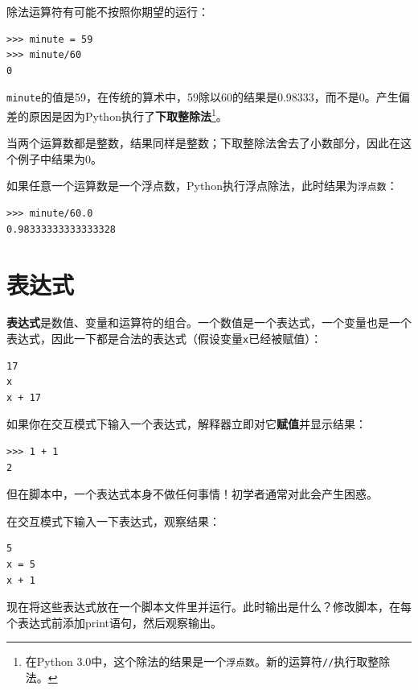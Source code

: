 

除法运算符有可能不按照你期望的运行：

\beforeverb
\begin{verbatim}
>>> minute = 59
>>> minute/60
0
\end{verbatim}
\afterverb
%
{\tt minute}的值是59，在传统的算术中，59除以60的结果是0.98333，而不是0。产生偏差的原因是因为Python执行了{\bf 下取整除法}\footnote{在Python 3.0中，这个除法的结果是一个{\tt 浮点数}。新的运算符{\tt //}执行取整除法。}。


当两个运算数都是整数，结果同样是整数；下取整除法舍去了小数部分，因此在这个例子中结果为0。

如果任意一个运算数是一个浮点数，Python执行浮点除法，此时结果为{\tt 浮点数}：

\beforeverb
\begin{verbatim}
>>> minute/60.0
0.98333333333333328
\end{verbatim}
\afterverb


\section{表达式}

{\bf 表达式}是数值、变量和运算符的组合。一个数值是一个表达式，一个变量也是一个表达式，因此一下都是合法的表达式（假设变量{\tt x}已经被赋值）：


\beforeverb
\begin{verbatim}
17
x
x + 17
\end{verbatim}
\afterverb
%
如果你在交互模式下输入一个表达式，解释器立即对它{\bf 赋值}并显示结果：

\beforeverb
\begin{verbatim}
>>> 1 + 1
2
\end{verbatim}
\afterverb
%
但在脚本中，一个表达式本身不做任何事情！初学者通常对此会产生困惑。

\begin{ex}
在交互模式下输入一下表达式，观察结果：

\beforeverb
\begin{verbatim}
5
x = 5
x + 1
\end{verbatim}
\afterverb
%
现在将这些表达式放在一个脚本文件里并运行。此时输出是什么？修改脚本，在每个表达式前添加print语句，然后观察输出。
\end{ex}


